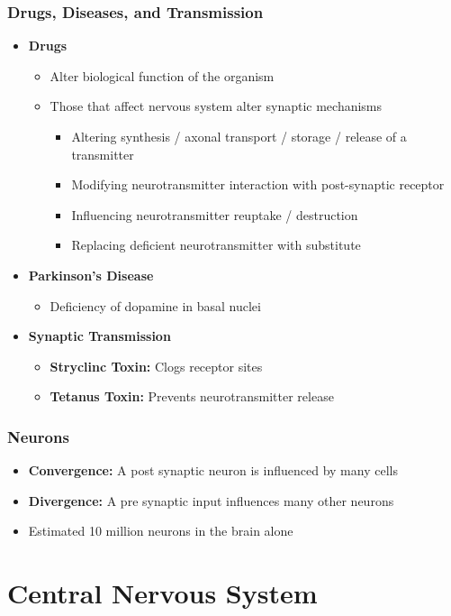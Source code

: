 \documentclass[11pt]{article}
\begin{document}
\subsubsection{Drugs, Diseases, and Transmission}
\begin{itemize}
\item \textbf{Drugs}
\begin{itemize}
\item Alter biological function of the organism
\item Those that affect nervous system alter synaptic mechanisms
\begin{itemize}
\item Altering synthesis / axonal transport / storage / release of a transmitter
\item Modifying neurotransmitter interaction with post-synaptic receptor
\item Influencing neurotransmitter reuptake / destruction
\item Replacing deficient neurotransmitter with substitute
\end{itemize}
\end{itemize}
\item \textbf{Parkinson's Disease}
\begin{itemize}
\item Deficiency of dopamine in basal nuclei
\end{itemize}
\item \textbf{Synaptic Transmission}
\begin{itemize}
\item\textbf{Stryclinc Toxin:} Clogs receptor sites
\item \textbf{Tetanus Toxin:} Prevents neurotransmitter release
\end{itemize}
\end{itemize}
\subsubsection{Neurons}
\begin{itemize}
\item \textbf{Convergence: }A post synaptic neuron is influenced by many cells
\item \textbf{Divergence: }A pre synaptic input influences many other neurons
\item Estimated 10 million neurons in the brain alone
\end{itemize}
\pagebreak


\section{Central Nervous System}
\end{document}
